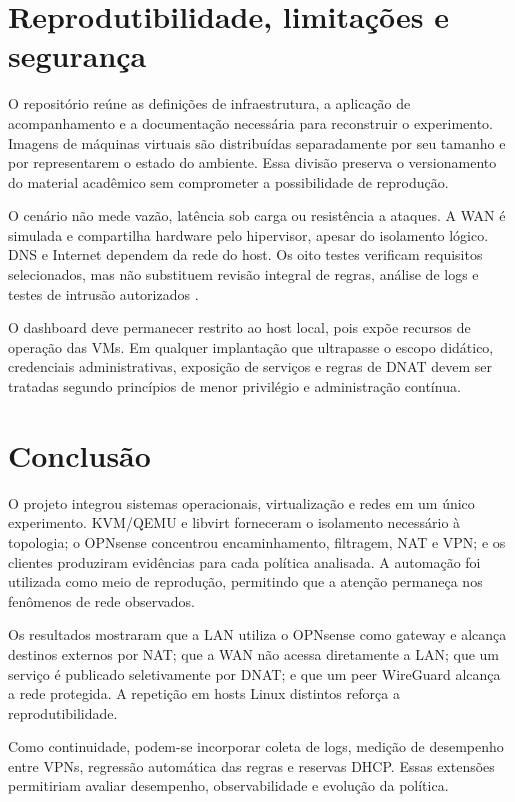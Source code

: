 \documentclass[12pt,a4paper]{article}
\begin{document}
\section{Reprodutibilidade, limitações e segurança}
O repositório reúne as definições de infraestrutura, a aplicação de
acompanhamento e a documentação necessária para reconstruir o experimento.
Imagens de máquinas virtuais são distribuídas separadamente por seu tamanho e
por representarem o estado do ambiente. Essa divisão preserva o versionamento do
material acadêmico sem comprometer a possibilidade de reprodução.

O cenário não mede vazão, latência sob carga ou resistência a ataques. A WAN é
simulada e compartilha hardware pelo hipervisor, apesar do isolamento lógico.
DNS e Internet dependem da rede do host. Os oito testes verificam requisitos
selecionados, mas não substituem revisão integral de regras, análise de logs e
testes de intrusão autorizados \citep{nist80041}.

O dashboard deve permanecer restrito ao host local, pois expõe recursos de
operação das VMs. Em qualquer implantação que ultrapasse o escopo didático,
credenciais administrativas, exposição de serviços e regras de DNAT devem ser
tratadas segundo princípios de menor privilégio e administração contínua.

\section{Conclusão}
O projeto integrou sistemas operacionais, virtualização e redes em um único
experimento. KVM/QEMU e libvirt forneceram o isolamento necessário à topologia;
o OPNsense concentrou encaminhamento, filtragem, NAT e VPN; e os clientes
produziram evidências para cada política analisada. A automação foi utilizada
como meio de reprodução, permitindo que a atenção permaneça nos fenômenos de
rede observados.

Os resultados mostraram que a LAN utiliza o OPNsense como gateway e alcança
destinos externos por NAT; que a WAN não acessa diretamente a LAN; que um serviço
é publicado seletivamente por DNAT; e que um peer WireGuard alcança a rede
protegida. A repetição em hosts Linux distintos reforça a reprodutibilidade.

Como continuidade, podem-se incorporar coleta de logs, medição de desempenho
entre VPNs, regressão automática das regras e reservas DHCP. Essas extensões
permitiriam avaliar desempenho, observabilidade e evolução da política.
\end{document}
